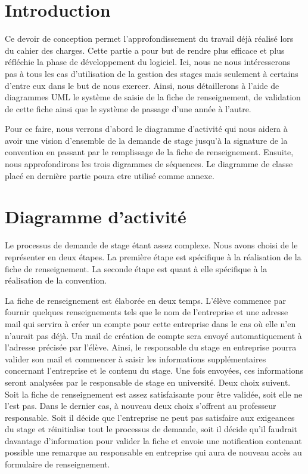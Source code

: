 \documentclass{scrreprt}
\begin{document}
\tableofcontents

\chapter{Introduction}

Ce devoir de conception permet l'approfondissement du travail déjà réalisé lors du 
cahier des charges. Cette partie a pour but de rendre plus efficace et plus réfléchie la phase 
de développement du logiciel. Ici, nous ne nous intéresserons pas à tous les cas d'utilisation 
de la gestion des stages mais seulement à certains d'entre eux dans le but de nous exercer. Ainsi, 
nous détaillerons à l'aide de diagrammes UML le système de saisie de la fiche de renseignement, de  
validation de cette fiche ainsi que le système de passage d'une année à l'autre.  

	Pour ce faire, nous verrons d'abord le diagramme d'activité qui nous aidera à avoir une vision 
d'ensemble de la demande de stage jusqu'à la signature de la convention en passant par le remplissage
de la fiche de renseignement. Ensuite, nous approfondirons les trois digrammes de séquences. Le diagramme
de classe placé en dernière partie poura etre utilisé comme annexe. 

\newpage
\chapter{Diagramme d'activité}

	Le processus de demande de stage étant assez complexe. Nous avons choisi de le représenter
en deux étapes. La première étape est spécifique à la réalisation de la fiche de renseignement. La 
seconde étape est quant à elle spécifique à la réalisation de la convention. 

	La fiche de renseignement est élaborée en deux temps. L'élève commence par fournir quelques
renseignements tels que le nom de l'entreprise et une adresse mail qui servira à créer un compte pour 
cette entreprise dans le cas où elle n'en n'aurait pas déjà. Un mail de création de compte sera envoyé
automatiquement à l'adresse précisée par l'élève. Ainsi, le responsable du stage en entreprise pourra
valider son mail et commencer à saisir les informations supplémentaires concernant l'entreprise et 
le contenu du stage. Une fois envoyées, ces informations seront analysées par le responsable de stage
en université. Deux choix suivent. Soit la fiche de renseignement est assez satisfaisante pour être 
validée, soit elle ne l'est pas. Dans le dernier cas, à nouveau deux choix s'offrent au professeur 
responsable. Soit il décide que l'entreprise ne peut pas satisfaire aux exigeances du stage et 
réinitialise tout le processus de demande, soit il décide qu'il faudrait davantage d'information pour valider
la fiche et envoie une notification contenant possible une remarque au responsable en entreprise
qui aura de nouveau accès au formulaire de renseignement. 
\end{document}

